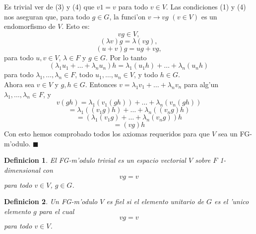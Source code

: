 \documentclass[a4paper,openright,12pt]{book}
\numberwithin{equation}{section} %
\newtheorem{definicion}{Definicion}[section] %
\newenvironment{proof}{\noindent{\it Demostracion:}}{\hfill$\blacksquare$} %
\begin{document}
\begin{proof}
Es trivial ver de (3) y (4) que $v1=v$ para todo $v \in V$. Las condiciones (1) y (4) nos aseguran que, para todo $g \in G$, la funci'on $v \rightarrow vg$ $(v \in V)$ es un endomorfismo de $V$. Esto es:
\[
vg \in V,
\]
\[
(\lambda v)g=\lambda (vg),
\]
\[
(u+v)g=ug+vg,
\]
para todo $u, v \in V$, $\lambda \in F$ y $g \in G$. Por lo tanto
\[
 (\lambda_{1}u_{1}+ \ldots +\lambda_{n}u_{n})h=\lambda_{1}(u_{1}h)+ \ldots +\lambda_{n}(u_{n}h) 
\]
para todo $\lambda_{1}, \ldots ,\lambda_{n} \in F$, todo $u_{1}, \ldots ,u_{n} \in V$, y todo $h \in G$.\\
Ahora sea $v \in V$ y $g, h \in G$. Entonces $v=\lambda_{1}v_{1}+ \ldots +\lambda_{n}v_{n}$ para alg'un $\lambda_{1}, \ldots ,\lambda_{n} \in F$, y
\[
v(gh)=\lambda_{1}(v_{1}(gh))+ \ldots + \lambda_{n}(v_{n}(gh))
\]
\[
=\lambda_{1}((v_{1}g)h)+ \ldots + \lambda_{n}((v_{n}g)h)
\]
\[
=(\lambda_{1}(v_{1}g)+ \ldots + \lambda_{n}(v_{n}g))h
\]
\[
=(vg)h
\]
Con esto hemos comprobado todos los axiomas requeridos para que $V$ sea un FG-m'odulo.
\end{proof}
\begin{definicion}
El FG-m'odulo trivial es un espacio vectorial $V$ sobre $F$ 1-dimensional con
\[
vg=v
\] 
para todo $v \in V$, $g \in G$.
\end{definicion}
\begin{definicion}
Un FG-m'odulo $V$ es fiel si el elemento unitario de $G$ es el 'unico elemento $g$ para el cual
\[
vg=v
\]
para todo $v \in V$.
\end{definicion}
\end{document}
